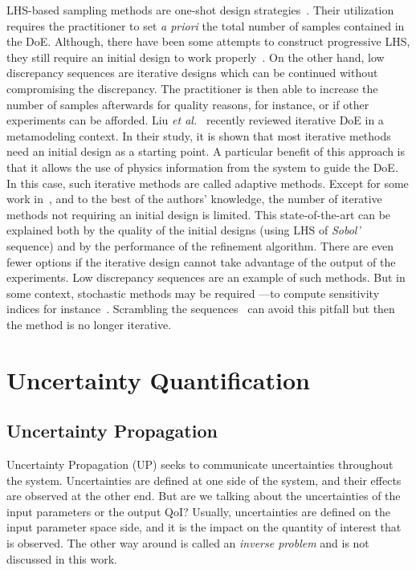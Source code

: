 LHS-based sampling methods are one-shot design strategies~\citep{Mckay1979,Fang2006}. Their utilization requires the practitioner to set \emph{a priori} the total number of samples contained in the DoE. Although, there have been some attempts to construct progressive LHS, they still require an initial design to work properly~\citep{Sheikholeslami2017}. On the other hand, low discrepancy sequences are iterative designs which can be continued without compromising the discrepancy. The practitioner is then able to increase the number of samples afterwards for quality reasons, for instance, or if other experiments can be afforded. Liu \emph{et al.}~\citep{Liu2018} recently reviewed iterative DoE in a metamodeling context. In their study, it is shown that most iterative methods need an initial design as a starting point. A particular benefit of this approach is that it allows the use of physics information from the system to guide the DoE. In this case, such iterative methods are called adaptive methods. Except for some work in~\citep{Crombecq2011}, and to the best of the authors’ knowledge, the number of iterative methods not requiring an initial design is limited. This state-of-the-art can be explained both by the quality of the initial designs (using LHS of \emph{Sobol'} sequence) and by the performance of the refinement algorithm. There are even fewer options if the iterative design cannot take advantage of the output of the experiments. Low discrepancy sequences are an example of such methods. But in some context, stochastic methods may be required ---\thinspace to compute sensitivity indices for instance~\citep{Saltelli2010}. Scrambling the sequences~\citep{Owen1998} can avoid this pitfall but then the method is no longer iterative.

\section{Uncertainty Quantification}\label{sec:uq}

\subsection{Uncertainty Propagation}\label{sec:up}
Uncertainty Propagation (UP) seeks to communicate uncertainties throughout the system. Uncertainties are defined at one side of the system, and their effects are observed at the other end. But are we talking about the uncertainties of the input parameters or the output QoI? Usually, uncertainties are defined on the input parameter space side, and it is the impact on the quantity of interest that is observed. The other way around is called an \emph{inverse problem} and is not discussed in this work.

